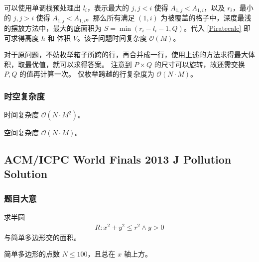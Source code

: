 				可以使用单调栈预处理出 $l_i$，表示最大的 $j, j<i$ 使得 $A_{1,j}<A_{1,i}$，以及 $r_i$，最小的 $j, j> i$ 使得 $A_{1,j}<A_{1,i}$。那么所有满足 $(1,i)$ 为被覆盖的格子中，深度最浅的摆放方法中，最大的底面积为 $S = \min( r_i - l_i -1 ,Q)$。代入 \eqref{Piratecalc} 即可求得高度 $h$ 和 体积 $V$。该子问题时间复杂度 $\mathcal{O}\left(M\right)$。
				
				对于原问题，不妨枚举箱子所跨的行，再合并成一行，使用上述的方法求得最大体积，取最优值，就可以求得答案。
				注意到 $P \times  Q$ 的尺寸可以旋转，故还需交换 $P, Q$ 的值再计算一次。
				仅枚举跨越的行复杂度为 $\mathcal{O}\left(N \cdot M\right)$。
				
			\subsubsection{时空复杂度}
				时间复杂度 $\mathcal{O}\left(N\cdot M^2\right)$。
					
				空间复杂度 $\mathcal{O}\left(N\cdot M\right)$。\newpage
		\subsection{ACM/ICPC World Finals 2013 J Pollution Solution}
			\subsubsection{题目大意}
				求半圆
				\begin{align}
					R: x^2+y^2 \le r^2 \land y>0
				\end{align}
				与简单多边形交的面积。
				
				简单多边形的点数 $N \le 100$，且总在 $x$ 轴上方。
			
